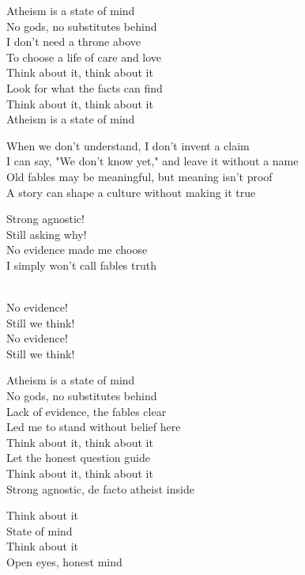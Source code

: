 \begin{lyrics}
Atheism is a state of mind\\
No gods, no substitutes behind\\
I don't need a throne above\\
To choose a life of care and love\\
Think about it, think about it\\
Look for what the facts can find\\
Think about it, think about it\\
Atheism is a state of mind

When we don't understand, I don't invent a claim\\
I can say, "We don't know yet," and leave it without a name\\
Old fables may be meaningful, but meaning isn't proof\\
A story can shape a culture without making it true

Strong agnostic!\\
Still asking why!\\
No evidence made me choose\\
I simply won't call fables truth

\\
No evidence!\\
Still we think!\\
No evidence!\\
Still we think!

Atheism is a state of mind\\
No gods, no substitutes behind\\
Lack of evidence, the fables clear\\
Led me to stand without belief here\\
Think about it, think about it\\
Let the honest question guide\\
Think about it, think about it\\
Strong agnostic, de facto atheist inside

Think about it\\
State of mind\\
Think about it\\
Open eyes, honest mind
\end{lyrics}

